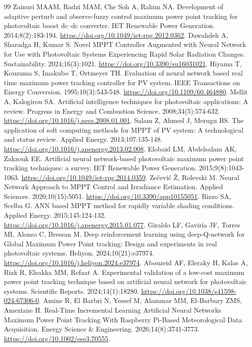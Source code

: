 \documentclass[Acad.Energy.,researcharticle,9pt,twoside,oneauthor]{Definitions/jams_academia}
\begin{document}
\begin{thebibliography}{99}
 Zainuri MAAM, Radzi MAM, Che Soh A, Rahim NA. Development of adaptive perturb and observe-fuzzy control maximum power point tracking for photovoltaic boost dc--dc converter. IET Renewable Power Generation. 2014;8(2):183-194. \url{https://doi.org/10.1049/iet-rpg.2012.0362}.
 Dawahdeh A, Sharadga H, Kumar S. Novel MPPT Controller Augmented with Neural Network for Use with Photovoltaic Systems Experiencing Rapid Solar Radiation Changes. Sustainability. 2024;16(3):1021. \url{https://doi.org/10.3390/su16031021}.
 Hiyama T, Kouzuma S, Imakubo T, Ortmeyer TH. Evaluation of neural network based real time maximum power tracking controller for PV system. IEEE Transactions on Energy Conversion. 1995;10(3):543-548. \url{https://doi.org/10.1109/60.464880}.
 Mellit A, Kalogirou SA. Artificial intelligence techniques for photovoltaic applications: A review. Progress in Energy and Combustion Science. 2008;34(5):574-632. \url{https://doi.org/10.1016/j.pecs.2008.01.001}.
 Salam Z, Ahmed J, Merugu BS. The application of soft computing methods for MPPT of PV system: A technological and status review. Applied Energy. 2013;107:135-148. \url{https://doi.org/10.1016/j.apenergy.2013.02.008}.
 Elobaid LM, Abdelsalam AK, Zakzouk EE. Artificial neural network-based photovoltaic maximum power point tracking techniques: a survey. IET Renewable Power Generation. 2015;9(8):1043-1063. \url{https://doi.org/10.1049/iet-rpg.2014.0359}.
 Zečević Ž, Rolevski M. Neural Network Approach to MPPT Control and Irradiance Estimation. Applied Sciences. 2020;10(15):5051. \url{https://doi.org/10.3390/app10155051}.
 Rizzo SA, Scelba G. ANN based MPPT method for rapidly variable shading conditions. Applied Energy. 2015;145:124-132. \url{https://doi.org/10.1016/j.apenergy.2015.01.077}.
 Giraldo LF, Gaviria JF, Torres MI, Alonso C, Bressan M. Deep reinforcement learning using deep-Q-network for Global Maximum Power Point tracking: Design and experiments in real photovoltaic systems. Heliyon. 2024;10(21):e37974. \url{https://doi.org/10.1016/j.heliyon.2024.e37974}.
 Abouzeid AF, Eleraky H, Kalas A, Rizk R, Elsakka MM, Refaat A. Experimental validation of a low-cost maximum power point tracking technique based on artificial neural network for photovoltaic systems. Scientific Reports. 2024;14(1):18280. \url{https://doi.org/10.1038/s41598-024-67306-0}.
 Amine R, El Barbri N, Yessef M, Alammar MM, El-Barbary ZMS, Ameziane H. Real-Time Incremental Learning Artificial Neural Networks Maximum Power Point Tracking With Raspberry Pi-Based Meteorological Data Acquisition. Energy Science \& Engineering. 2026;14(8):3741-3773. \url{https://doi.org/10.1002/ese3.70555}.

\end{thebibliography}
\end{document}

